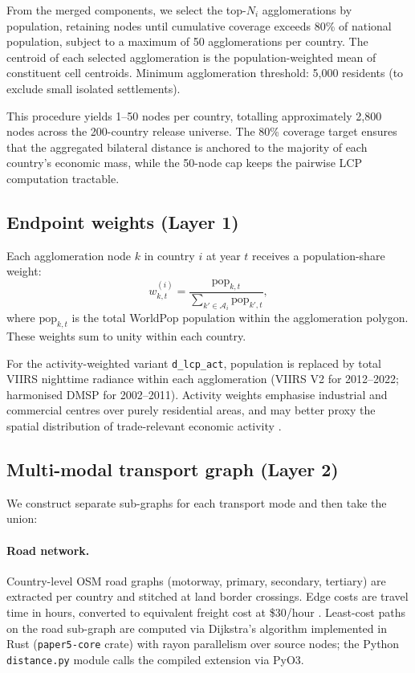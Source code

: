 \documentclass[11pt, a4paper]{article}
\begin{document}
From the merged components, we select the top-$N_i$ agglomerations by
population, retaining nodes until cumulative coverage exceeds 80\% of
national population, subject to a maximum of 50 agglomerations per country.
The centroid of each selected agglomeration is the population-weighted mean
of constituent cell centroids.  Minimum agglomeration threshold: 5{,}000
residents (to exclude small isolated settlements).

This procedure yields 1--50 nodes per country, totalling approximately
2{,}800 nodes across the 200-country release universe.  The 80\% coverage
target ensures that the aggregated bilateral distance is anchored to the
majority of each country's economic mass, while the 50-node cap keeps the
pairwise LCP computation tractable.

\subsection{Endpoint weights (Layer 1)}
\label{sec:construction:weights}

Each agglomeration node $k$ in country $i$ at year $t$ receives a
population-share weight:
\begin{equation}
  w^{(i)}_{k,t} = \frac{\text{pop}_{k,t}}{\sum_{k' \in \mathcal{A}_i}
  \text{pop}_{k',t}},
\label{eq:weights}
\end{equation}
where $\text{pop}_{k,t}$ is the total WorldPop population within the
agglomeration polygon.  These weights sum to unity within each country.

For the activity-weighted variant \texttt{d\_lcp\_act}, population is
replaced by total VIIRS nighttime radiance within each agglomeration
(VIIRS V2 for 2012--2022; harmonised DMSP for 2002--2011).  Activity weights
emphasise industrial and commercial centres over purely residential areas,
and may better proxy the spatial distribution of trade-relevant economic
activity \citep{henderson_storeygard_weil_2012, ghosh_et_al_2021}.

\subsection{Multi-modal transport graph (Layer 2)}
\label{sec:construction:graph}

We construct separate sub-graphs for each transport mode and then take the
union:

\paragraph{Road network.}
Country-level OSM road graphs (motorway, primary, secondary, tertiary) are
extracted per country and stitched at land border crossings.  Edge costs are
travel time in hours, converted to equivalent freight cost at \$30/hour
\citep{hummels_schaur_2013}.  Least-cost paths on the road sub-graph are
computed via Dijkstra's algorithm implemented in Rust
(\texttt{paper5-core} crate) with rayon parallelism over source nodes; the
Python \texttt{distance.py} module calls the compiled extension via PyO3.
\end{document}
